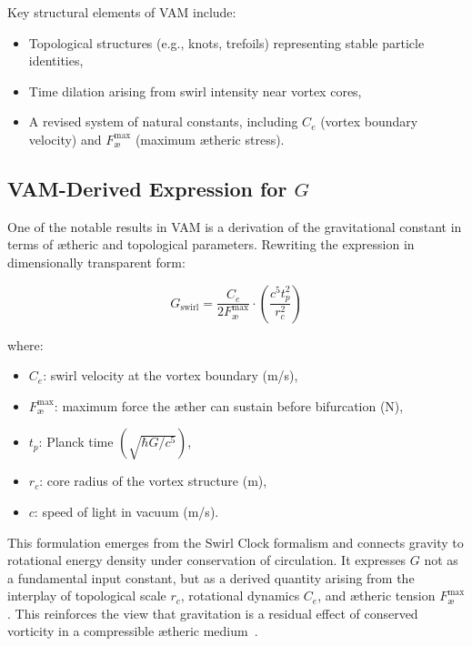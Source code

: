 \documentclass[preprint]{revtex4-2}
\begin{document}
Key structural elements of VAM include:
\begin{itemize}
    \item Topological structures (e.g., knots, trefoils) representing stable particle identities,
    \item Time dilation arising from swirl intensity near vortex cores,
    \item A revised system of natural constants, including \( C_e \) (vortex boundary velocity) and \( F^{\max}_{\text{\ae}} \) (maximum ætheric stress).
\end{itemize}

\subsection*{VAM-Derived Expression for \( G \)}

One of the notable results in VAM is a derivation of the gravitational constant in terms of ætheric and topological parameters. Rewriting the expression in dimensionally transparent form:

\begin{equation}
    G_\text{swirl} = \frac{C_e}{2 F^{\max}_{\text{\ae}}} \cdot \left( \frac{c^5 t_p^2}{r_c^2} \right)
\end{equation}

\noindent where:
\begin{itemize}
    \item \( C_e \): swirl velocity at the vortex boundary (m/s),
    \item \( F^{\max}_{\text{\ae}} \): maximum force the æther can sustain before bifurcation (N),
    \item \( t_p \): Planck time \( (\sqrt{\hbar G / c^5}) \),
    \item \( r_c \): core radius of the vortex structure (m),
    \item \( c \): speed of light in vacuum (m/s).
\end{itemize}

This formulation emerges from the Swirl Clock formalism and connects gravity to rotational energy density under conservation of circulation. It expresses \( G \) not as a fundamental input constant, but as a derived quantity arising from the interplay of topological scale \( r_c \), rotational dynamics \( C_e \), and ætheric tension \( F^{\max}_{\text{\ae}} \). This reinforces the view that gravitation is a residual effect of conserved vorticity in a compressible ætheric medium~\cite{iskandarani2025vam2}.
\end{document}
